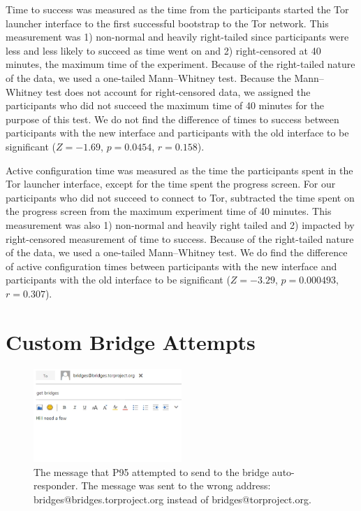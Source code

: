 \documentclass[USenglish,oneside,twocolumn]{article}
\begin{document}
Time to success was measured as the time from the participants started the Tor launcher interface to the first successful bootstrap to the Tor network. This measurement was 1) non-normal and heavily right-tailed since participants were less and less likely to succeed as time went on and 2) right-censored at 40 minutes, the maximum time of the experiment. Because of the right-tailed nature of the data, we used a one-tailed Mann--Whitney test. Because the Mann--Whitney test does not account for right-censored data, we assigned the participants who did not succeed the maximum time of 40 minutes for the purpose of this test. We do not find the difference of times to success between participants with the new interface and participants with the old interface to be significant ($ Z = -1.69$, $p = 0.0454$, $r= 0.158$). 

Active configuration time was measured as the time the participants spent in the Tor launcher interface, except for the time spent the progress screen. For our participants who did not succeed to connect to Tor, subtracted the time spent on the progress screen from the maximum experiment time of 40 minutes. This measurement was also 1) non-normal and heavily right tailed and 2) impacted by right-censored measurement of time to success. Because of the right-tailed nature of the data, we used a one-tailed Mann--Whitney test. We do find the difference of active configuration times between participants with the new interface and participants with the old interface to be significant ($Z = -3.29$, $p = 0.000493$, $r = 0.307$).

\section{Custom Bridge Attempts} 
\label{failed-participants}

\begin{figure}[h]
\includegraphics[width=0.5\textwidth]{../experiment/processing/failed-participants/20160325-140813-bridgeresponder-redacted.png}
\caption{The message that P95 attempted to send to the bridge auto-responder. The message was sent to the wrong address: bridges@bridges.torproject.org instead of bridges@torproject.org.}
\label{autoresponder1}
\end{figure} 
\end{document}
